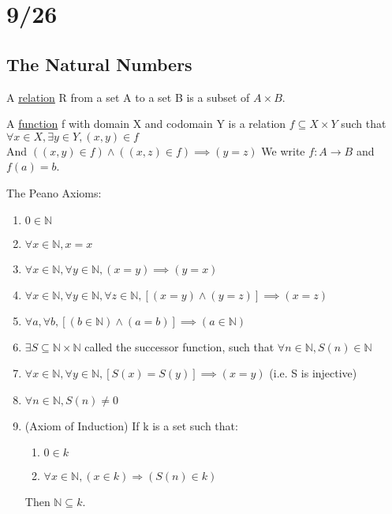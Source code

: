 \section{9/26}
\subsection{The Natural Numbers}
\begin{definition}
  A \underline{relation} R from a set A to a set B is a subset of $A \times B$. 
\end{definition}
\begin{definition}
  A \underline{function} f with domain X and codomain Y is a relation $f \subseteq X \times Y$ such that $\forall x \in X, \exists y \in Y, (x, y) \in f$
  \\
  And $((x, y) \in f) \land ((x, z) \in f) \implies (y = z)$
  We write $f: A \to B$ and $f(a) = b$.
\end{definition}

The Peano Axioms:
\begin{enumerate}
  \item $0 \in \mathbb{N}$
  \item $\forall x \in \mathbb{N}, x = x$
  \item $\forall x \in \mathbb{N}, \forall y \in \mathbb{N}, (x = y) \implies (y = x)$
  \item $\forall x \in \mathbb{N}, \forall y \in \mathbb{N}, \forall z \in \mathbb{N}, [(x = y) \land (y = z)] \implies (x = z)$
  \item $\forall a, \forall b, [(b \in \mathbb{N}) \land (a = b)] \implies (a \in \mathbb{N})$
  \item $\exists S \subseteq \mathbb{N} \times \mathbb{N}$ called the successor function, such that $\forall n \in \mathbb{N}, S(n) \in \mathbb{N}$
  \item $\forall x \in \mathbb{N}, \forall y \in \mathbb{N}, [S(x) = S(y)] \implies (x = y)$ (i.e. S is injective)
  \item $\forall n \in \mathbb{N}, S(n) \neq 0$
  \item (Axiom of Induction) If k is a set such that:
    \begin{enumerate}
      \item $0 \in k$
      \item $\forall x \in \mathbb{N}, (x \in k) \Rightarrow (S(n) \in k)$
    \end{enumerate}
    Then $\mathbb{N} \subseteq k$.
\end{enumerate}

